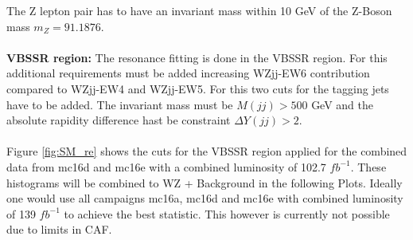 \documentclass[../Bachelorarbeit.tex]{subfiles}
\begin{document}
The Z lepton pair has to have an invariant mass within 10 GeV of the Z-Boson mass $m_{Z}=91.1876$.
\\\\
\textbf{VBSSR region:} The resonance fitting is done in the VBSSR region. For this additional requirements must be added
increasing WZjj-EW6 contribution compared to WZjj-EW4 and WZjj-EW5. For this two cuts for the tagging jets have to be added. The invariant mass must be
$M(jj)>500$ GeV and the absolute rapidity difference hast be constraint $\Delta Y(jj) >2$.
\\\\
Figure \ref*{fig:SM_re} shows the cuts for the VBSSR region applied for the combined data from mc16d and mc16e with a combined luminosity of 102.7 $fb^{-1}$.
These histograms will be combined to WZ + Background in the following Plots.
Ideally one would use all campaigns mc16a, mc16d and mc16e with combined luminosity of 139 $fb^{-1}$ to achieve the best statistic.
This however is currently not possible due to limits in CAF.
\end{document}
